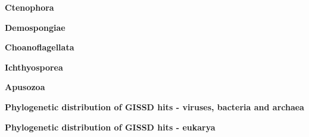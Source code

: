 \documentclass[landscape]{slides}
\begin{document}
\begin{slide}
\begin{center}
\textbf{Ctenophora}
\end{center}


\vfill
\end{slide}
\begin{slide}
\begin{center}
\textbf{Demospongiae}
\end{center}


\vfill
\end{slide}
\begin{slide}
\begin{center}
\textbf{Choanoflagellata}
\end{center}


\vfill
\end{slide}
\begin{slide}
\begin{center}
\textbf{Ichthyosporea}
\end{center}


\vfill
\end{slide}
\begin{slide}
\begin{center}
\textbf{Apusozoa}
\end{center}


\vfill
\end{slide}
\begin{slide}
\begin{center}
\small
\textbf{Phylogenetic distribution of GISSD hits - viruses, bacteria
  and archaea}
\end{center}


\vfill
\end{slide}
\begin{slide}
\begin{center}
\small
\textbf{Phylogenetic distribution of GISSD hits - eukarya}
\end{center}


\vfill
\end{slide}
\end{document}
